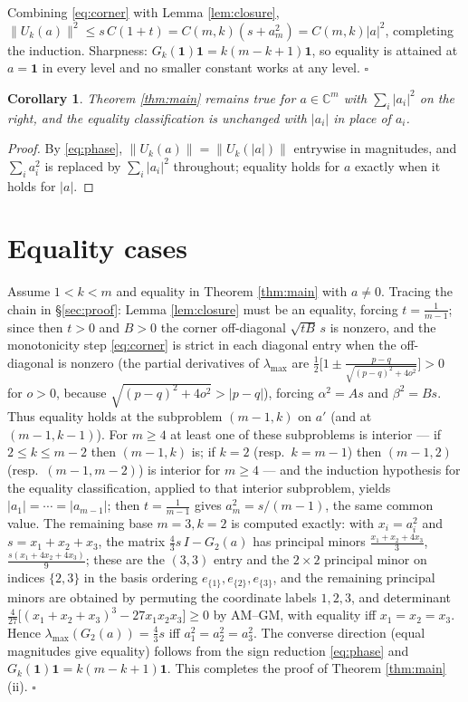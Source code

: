 \documentclass[11pt]{article}
\newtheorem{corollary}{Corollary}
\theoremstyle{remark}
\begin{document}
Combining \eqref{eq:corner} with Lemma \ref{lem:closure},
$\|U_k(a)\|^2\le s\,C(1+t)=C(m,k)(s+a_m^2)=C(m,k)|a|^2$, completing the
induction. Sharpness: $G_k(\mathbf 1)\mathbf 1=k(m-k+1)\mathbf 1$, so
equality is attained at $a=\mathbf 1$ in every level and no smaller
constant works at any level. \hfill$\square$

\begin{corollary}\label{cor:complex}
Theorem \ref{thm:main} remains true for $a\in\mathbb{C}^m$ with
$\sum_i|a_i|^2$ on the right, and the equality classification is unchanged
with $|a_i|$ in place of $a_i$.
\end{corollary}
\begin{proof}
By \eqref{eq:phase}, $\|U_k(a)\|=\|U_k(|a|)\|$ entrywise in magnitudes, and
$\sum_i a_i^2$ is replaced by $\sum_i|a_i|^2$ throughout; equality holds
for $a$ exactly when it holds for $|a|$.
\end{proof}

\section{Equality cases}\label{sec:equality}

Assume $1<k<m$ and equality in Theorem \ref{thm:main} with $a\ne0$.
Tracing the chain in \S\ref{sec:proof}: Lemma \ref{lem:closure} must be an
equality, forcing $t=\frac1{m-1}$; since then $t>0$ and $B>0$ the corner
off-diagonal $\sqrt{tB}\,s$ is nonzero, and the monotonicity step
\eqref{eq:corner} is strict in each diagonal entry when the off-diagonal
is nonzero (the partial derivatives of $\lambda_{\max}$ are
$\frac12\bigl[1\pm\frac{p-q}{\sqrt{(p-q)^2+4o^2}}\bigr]>0$ for $o>0$,
because $\sqrt{(p-q)^2+4o^2}>|p-q|$), forcing $\alpha^2=As$ and
$\beta^2=Bs$. Thus equality holds
at the subproblem $(m-1,k)$ on $a'$ (and at $(m-1,k-1)$). For $m\ge4$ at
least one of these subproblems is interior --- if $2\le k\le m-2$ then
$(m-1,k)$ is; if $k=2$ (resp.\ $k=m-1$) then $(m-1,2)$ (resp.\
$(m-1,m-2)$) is interior for $m\ge4$ --- and the induction hypothesis for the
equality classification, applied to that interior subproblem, yields
$|a_1|=\cdots=|a_{m-1}|$; then $t=\frac1{m-1}$ gives
$a_m^2=s/(m-1)$, the same common value. The remaining base $m=3,k=2$ is
computed exactly: with $x_i=a_i^2$ and $s=x_1+x_2+x_3$, the matrix
$\frac43 s\,I-G_2(a)$ has principal minors
$\frac{x_1+x_2+4x_3}{3}$, $\frac{s(x_1+4x_2+4x_3)}{9}$; these are the $(3,3)$
entry and the $2\times2$ principal minor on indices $\{2,3\}$ in the basis
ordering $e_{\{1\}},e_{\{2\}},e_{\{3\}}$, and the remaining principal minors
are obtained by permuting the coordinate labels $1,2,3$,
and determinant $\frac4{27}\bigl[(x_1+x_2+x_3)^3-27x_1x_2x_3\bigr]\ge0$ by
AM--GM, with equality iff $x_1=x_2=x_3$. Hence
$\lambda_{\max}(G_2(a))=\frac43 s$ iff $a_1^2=a_2^2=a_3^2$. The converse
direction (equal magnitudes give equality) follows from the sign reduction
\eqref{eq:phase} and $G_k(\mathbf 1)\mathbf 1=k(m-k+1)\mathbf 1$.
This completes the proof of Theorem \ref{thm:main}(ii). \hfill$\square$
\end{document}
